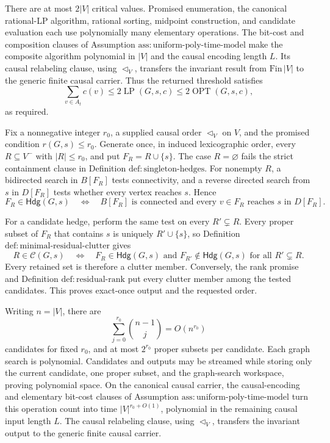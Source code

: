There are at most \(2|V|\) critical values.  Promised enumeration, the
canonical rational-LP algorithm, rational sorting, midpoint construction,
and candidate evaluation each use polynomially many elementary operations.
The bit-cost and composition clauses of Assumption
\(\mathrm{ass{:}uniform\mbox{-}poly\mbox{-}time\mbox{-}model}\) make the
composite algorithm polynomial in \(|V|\) and the causal encoding length
\(L\).  Its causal relabeling clause, using \(\triangleleft_V\), transfers
the invariant result from \(\mathrm{Fin}\,|V|\) to the generic finite
causal carrier.  Thus the returned threshold satisfies
\[
 \sum_{v\in A_t}c(v)
 \leq2\operatorname{LP}(G,s,c)
 \leq2\operatorname{OPT}(G,s,c),
\]
as required.

Fix a nonnegative integer \(r_0\), a supplied causal order
\(\triangleleft_V\) on \(V\), and the promised condition
\(r(G,s)\leq r_0\).  Generate once, in induced lexicographic order, every
\(R\subseteq V^{-}\) with \(|R|\leq r_0\), and put
\(F_R=R\cup\{s\}\).  The case \(R=\varnothing\) fails the strict
containment clause in Definition \(\mathrm{def{:}singleton\mbox{-}hedges}\).
For nonempty \(R\), a bidirected search in \(B[F_R]\) tests connectivity,
and a reverse directed search from \(s\) in \(D[F_R]\) tests whether every
vertex reaches \(s\).  Hence
\[
 F_R\in\mathsf{Hdg}(G,s)
 \quad\Longleftrightarrow\quad
 B[F_R]\text{ is connected and every }v\in F_R
 \text{ reaches }s\text{ in }D[F_R].
\]

For a candidate hedge, perform the same test on every
\(R'\subsetneq R\).  Every proper subset of \(F_R\) that contains \(s\)
is uniquely \(R'\cup\{s\}\), so Definition
\(\mathrm{def{:}minimal\mbox{-}residual\mbox{-}clutter}\) gives
\[
 R\in\mathcal C(G,s)
 \quad\Longleftrightarrow\quad
 F_R\in\mathsf{Hdg}(G,s)
 \text{ and }F_{R'}\notin\mathsf{Hdg}(G,s)
 \text{ for all }R'\subsetneq R.
\]
Every retained set is therefore a clutter member.  Conversely, the rank
promise and Definition \(\mathrm{def{:}residual\mbox{-}rank}\) put every
clutter member among the tested candidates.  This proves exact-once output
and the requested order.

Writing \(n=|V|\), there are
\[
 \sum_{j=0}^{r_0}\binom{n-1}{j}=O(n^{r_0})
\]
candidates for fixed \(r_0\), and at most \(2^{r_0}\) proper subsets per
candidate.  Each graph search is polynomial.  Candidates and outputs may be
streamed while storing only the current candidate, one proper subset, and
the graph-search workspace, proving polynomial space.  On the canonical
causal carrier, the causal-encoding and elementary bit-cost clauses of
Assumption \(\mathrm{ass{:}uniform\mbox{-}poly\mbox{-}time\mbox{-}model}\)
turn this operation count into time \(|V|^{r_0+O(1)}\), polynomial in the
remaining causal input length \(L\).  The causal relabeling clause, using
\(\triangleleft_V\), transfers the invariant output to the generic finite
causal carrier.

